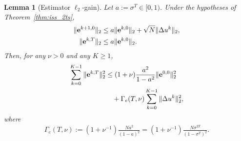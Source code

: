 \documentclass[10pt,a4paper]{amsart}
\newtheorem{lemma}{Lemma}
\begin{document}
\begin{lemma}[Estimator $\ell_2$-gain]\label{lem:l2_gain}
Let \(a:=\sigma^T\in[0,1)\). Under the hypotheses of Theorem~\ref{thm:iss_2ts},
\begin{align}
\|\mathbf e^{k+1,0}\|_2
&\le
a\|\mathbf e^{k,0}\|_2+\sqrt N\|\Delta u^k\|_2, \notag\\
\|\mathbf e^{k,T}\|_2
&\le
a\|\mathbf e^{k,0}\|_2 .
\end{align}
Then, for any \(\nu>0\) and any \(K\ge 1\),
\begin{align}
\sum_{k=0}^{K-1}\|\mathbf e^{k,T}\|_2^2
&\le
(1+\nu)\frac{a^2}{1-a^2}\|\mathbf e^{0,0}\|_2^2 \notag\\
&\quad +
\Gamma_e(T,\nu)
\sum_{k=0}^{K-1}\|\Delta u^k\|_2^2,
\end{align}
where
\begin{align}
\Gamma_e(T,\nu)
:=
(1+\nu^{-1})
\frac{N a^2}{(1-a)^2}
=
(1+\nu^{-1})
\frac{N\sigma^{2T}}{(1-\sigma^T)^2}.
\end{align}
\end{lemma}
\end{document}
